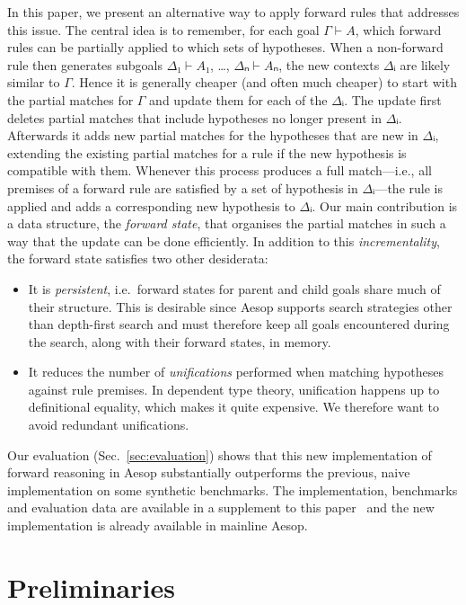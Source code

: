 \documentclass[runningheads,leqno]{llncs}
\begin{document}
In this paper, we present an alternative way to apply forward rules that addresses this issue.
The central idea is to remember, for each goal $Γ ⊢ A$, which forward rules can be partially applied to which sets of hypotheses.
When a non-forward rule then generates subgoals $Δ₁ ⊢ A₁$, \dots, $Δₙ ⊢ Aₙ$, the new contexts $Δᵢ$ are likely similar to $Γ$.
Hence it is generally cheaper (and often much cheaper) to start with the partial matches for $Γ$ and update them for each of the $Δᵢ$.
The update first deletes partial matches that include hypotheses no longer present in $Δᵢ$.
Afterwards it adds new partial matches for the hypotheses that are new in $Δᵢ$, extending the existing partial matches for a rule if the new hypothesis is compatible with them.
Whenever this process produces a full match---i.e., all premises of a forward rule are satisfied by a set of hypothesis in $Δᵢ$---the rule is applied and adds a corresponding new hypothesis to $Δᵢ$.
Our main contribution is a data structure, the \emph{forward state}, that organises the partial matches in such a way that the update can be done efficiently.
In addition to this \emph{incrementality}, the forward state satisfies two other desiderata:
\begin{itemize}
  \item It is \emph{persistent}, i.e.\ forward states for parent and child goals share much of their structure.
        This is desirable since Aesop supports search strategies other than depth-first search and must therefore keep all goals encountered during the search, along with their forward states, in memory.
  \item It reduces the number of \emph{unifications} performed when matching hypotheses against rule premises.
        In dependent type theory, unification happens up to definitional equality, which makes it quite expensive.
        We therefore want to avoid redundant unifications.
\end{itemize}

Our evaluation (Sec.~\ref{sec:evaluation}) shows that this new implementation of forward reasoning in Aesop substantially outperforms the previous, naive implementation on some synthetic benchmarks.
The implementation, benchmarks and evaluation data are available in a supplement to this paper~\cite{supplement} and the new implementation is already available in mainline Aesop.

\section{Preliminaries}
\end{document}
